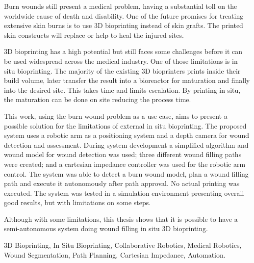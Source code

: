 
Burn wounds still present a medical problem, having a substantial toll on the worldwide cause of death and disability. One of the future promises for treating extensive skin burns is to use 3D bioprinting instead of skin grafts. The printed skin constructs will replace or help to heal the injured sites.

3D bioprinting has a high potential but still faces some challenges before it can be used widespread across the medical industry. One of those limitations is in situ bioprinting. The majority of the existing 3D bioprinters prints inside their build volume, later transfer the result into a bioreactor for maturation and finally into the desired site. This takes time and limits escalation. By printing in situ, the maturation can be done on site reducing the process time.

This work, using the burn wound problem as a use case, aims to present a possible solution for the limitations of external in situ bioprinting. The proposed system uses a robotic arm as a positioning system and a depth camera for wound detection and assessment. During system development a simplified algorithm and wound model for wound detection was used; three different wound filling paths were created; and a cartesian impedance controller was used for the robotic arm control. The system was able to detect a burn wound model, plan a wound filling path and execute it autonomously after path approval. No actual printing was executed. The system was tested in a simulation environment presenting overall good results, but with limitations on some steps.

Although with some limitations, this thesis shows that it is possible to have a semi-autonomous system doing wound filling in situ 3D bioprinting.

\begin{keywords}
3D Bioprinting, In Situ Bioprinting, Collaborative Robotics, Medical Robotics, Wound Segmentation, Path Planning, Cartesian Impedance, Automation.
\end{keywords} 
